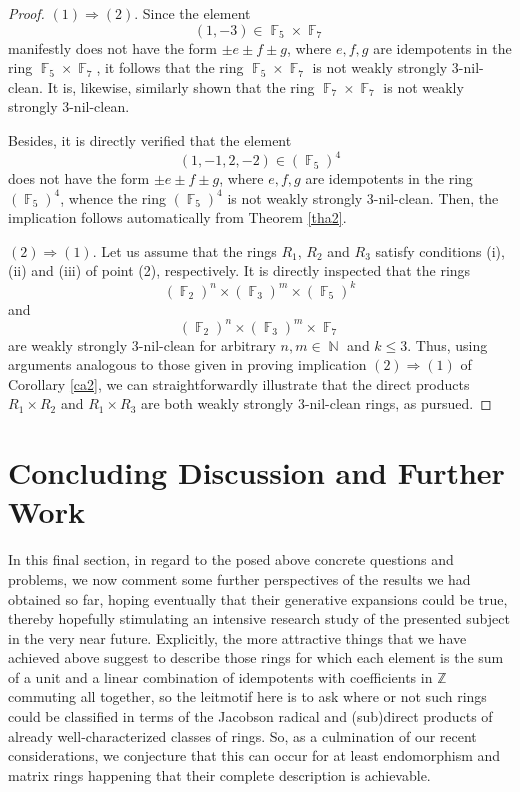 \documentclass{amsart}
\DeclareMathOperator{\N}{\mathbb{N}}
\DeclareMathOperator{\F}{\mathbb{F}}
\theoremstyle{definition}
\theoremstyle{remark}
\numberwithin{equation}{section}
\begin{document}
\begin{proof}
$(1) \Rightarrow (2)$. Since the element $$(1, -3)\in \F_5\times \F_7$$ manifestly does not have the form $\pm e\pm f \pm g$, where $e, f, g$ are idempotents in the ring $\F_5\times \F_7$, it follows that the ring $\F_5\times \F_7$ is not weakly strongly 3-nil-clean. It is, likewise, similarly shown that the ring $\F_7\times \F_7$ is not weakly strongly 3-nil-clean.

Besides, it is directly verified that the element $$(1, -1, 2, -2)\in (\F_5)^4$$ does not have the form $\pm e\pm f \pm g$, where $e, f, g$ are idempotents in the ring $(\F_5)^4$, whence the ring $(\F_5)^4$ is not weakly strongly 3-nil-clean. Then, the implication follows automatically from Theorem \ref{tha2}.

$(2) \Rightarrow (1)$. Let us assume that the rings $R_1$, $R_2$ and $R_3$ satisfy conditions (i), (ii) and (iii) of point (2), respectively. It is directly inspected that the rings $$(\F_2)^{n}\times (\F_3)^{m}\times (\F_5)^k$$ and $$(\F_2)^{n}\times (\F_3)^{m}\times \F_7$$ are weakly strongly 3-nil-clean for arbitrary $n,m\in \N$ and $k\leq 3$.
Thus, using arguments analogous to those given in proving implication $(2) \Rightarrow (1)$ of Corollary \ref{ca2}, we can straightforwardly illustrate that the direct products $R_1\times R_2$ and $R_1\times R_3$ are both weakly strongly 3-nil-clean rings, as pursued.
\end{proof}

\section{Concluding Discussion and Further Work}

In this final section, in regard to the posed above concrete questions and problems, we now comment some further perspectives of the results we had obtained so far, hoping eventually that their generative expansions could be true, thereby hopefully stimulating an intensive research study of the presented subject in the very near future. Explicitly, the more attractive things that we have achieved above suggest to describe those rings for which each element is the sum of a unit and a linear combination of idempotents with coefficients in $\mathbb{Z}$ commuting all together, so the leitmotif here is to ask where or not such rings could be classified in terms of the Jacobson radical and (sub)direct products of already well-characterized classes of rings. So, as a culmination of our recent considerations, we conjecture that this can occur for at least endomorphism and matrix rings happening that their complete description is achievable.
\end{document}
